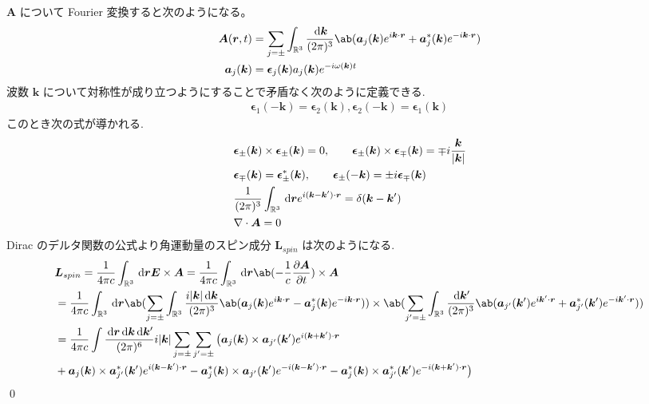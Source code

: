 \documentclass[uplatex,dvipdfmx,a4paper,11pt]{jlreq}
\makeatletter
\newcommand{\RR}{\mathbb{R}}
\newcommand{\EE}{\bm{E}}
\renewcommand{\AA}{\bm{A}}
\newcommand{\rr}{\bm{r}}
\newcommand{\kk}{\bm{k}}
\newcommand{\LL}{\bm{L}}
\newcommand{\ee}{\bm{\epsilon}}
\newcommand{\vnabla}{\mathbf{\nabla}}
\theoremstyle{definition}
\renewenvironment{proof}[1][\proofname]{\par
  \normalfont
  \topsep6\p@\@plus6\p@ \trivlist
  \item[\hskip\labelsep{\bfseries #1}\@addpunct{\bfseries}]\ignorespaces\quad\par
}{%
  \qed\endtrivlist\@endpefalse
}
\renewcommand\proofname{証明}
\makeatother
\begin{document}
\begin{proof}
  $\AA$ について Fourier 変換すると次のようになる。
  \begin{align}
    \AA(\rr, t)   & = \sum_{j=\pm}\int_{\RR^3}\frac{\dl{\kk}}{(2\pi)^3}\ab(\bm{a}_j(\kk)e^{i\kk\cdot\rr} + \bm{a}_j^*(\kk)e^{-i\kk\cdot\rr}) \\
    \bm{a}_j(\kk) & = \ee_j(\kk)a_j(\kk)e^{-i\omega(\kk)t}
  \end{align}
  波数 $\kk$ について対称性が成り立つようにすることで矛盾なく次のように定義できる.
  \begin{align}
    \ee_1(-\kk) = \ee_2(\kk), \ee_2(-\kk) = \ee_1(\kk)
  \end{align}
  このとき次の式が導かれる.
  \begin{align}
     & \ee_\pm(\kk)\times\ee_\pm(\kk) = 0, \qquad \ee_\pm(\kk)\times\ee_\mp(\kk) = \mp i\frac{\kk}{|\kk|} \\
     & \ee_\mp(\kk) = \ee_\pm^*(\kk), \qquad \ee_\pm(-\kk) = \pm i\ee_\mp(\kk)                            \\
     & \frac{1}{(2\pi)^3}\int_{\RR^3}\dl{\rr}e^{i(\kk - \kk')\cdot\rr} = \delta(\kk - \kk')               \\
     & \vnabla\cdot\AA = 0
  \end{align}
  Dirac のデルタ関数の公式より角運動量のスピン成分 $\LL_{spin}$ は次のようになる.
  \begin{align}
     & \LL_{spin} = \frac{1}{4\pi c}\int_{\RR^3}\dl{\rr}\EE\times\AA = \frac{1}{4\pi c}\int_{\RR^3}\dl{\rr}\ab(-\frac{1}{c}\diffp{\AA}{t})\times\AA                                                                                                                                                                         \\
     & = \frac{1}{4\pi c}\int_{\RR^3}\dl{\rr}\ab(\sum_{j=\pm}\int_{\RR^3}\frac{i|\kk|\dl{\kk}}{(2\pi)^3}\ab(\bm{a}_j(\kk)e^{i\kk\cdot\rr} - \bm{a}_j^*(\kk)e^{-i\kk\cdot\rr}))\times\ab(\sum_{j'=\pm}\int_{\RR^3}\frac{\dl{\kk'}}{(2\pi)^3}\ab(\bm{a}_{j'}(\kk')e^{i\kk'\cdot\rr} + \bm{a}_{j'}^*(\kk')e^{-i\kk'\cdot\rr})) \\
     & = \frac{1}{4\pi c}\int\frac{\dl{\rr}\dl{\kk}\dl{\kk'}}{(2\pi)^6}i|\kk|\sum_{j=\pm}\sum_{j'=\pm}\big(\bm{a}_j(\kk)\times\bm{a}_{j'}(\kk')e^{i(\kk + \kk')\cdot\rr}                                                                                                                                                    \\
     & + \bm{a}_j(\kk)\times\bm{a}_{j'}^*(\kk')e^{i(\kk - \kk')\cdot\rr} - \bm{a}_j^*(\kk)\times\bm{a}_{j'}(\kk')e^{-i(\kk - \kk')\cdot\rr} - \bm{a}_j^*(\kk)\times\bm{a}_{j'}^*(\kk')e^{-i(\kk+\kk')\cdot\rr}\big)                                                                                                         \\

\end{align}
\end{proof}
\end{document}
